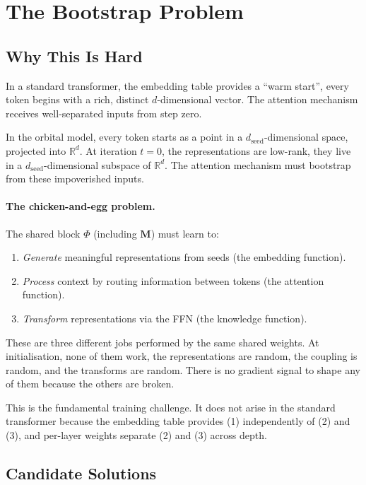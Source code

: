\documentclass[11pt, a4paper]{article}
\newcommand{\M}{\mathbf{M}}
\newcommand{\R}{\mathbb{R}}
\theoremstyle{remark}
\begin{document}
\section{The Bootstrap Problem}

\subsection{Why This Is Hard}

In a standard transformer, the embedding table provides a ``warm start'', every token begins with a rich, distinct $d$-dimensional vector.
The attention mechanism receives well-separated inputs from step zero.

In the orbital model, every token starts as a point in a $d_{\text{seed}}$-dimensional space, projected into $\R^d$.
At iteration $t{=}0$, the representations are low-rank, they live in a $d_{\text{seed}}$-dimensional subspace of $\R^d$.
The attention mechanism must bootstrap from these impoverished inputs.

\paragraph{The chicken-and-egg problem.}
The shared block $\Phi$ (including $\M$) must learn to:
\begin{enumerate}[nosep]
    \item \emph{Generate} meaningful representations from seeds (the embedding function).
    \item \emph{Process} context by routing information between tokens (the attention function).
    \item \emph{Transform} representations via the FFN (the knowledge function).
\end{enumerate}
These are three different jobs performed by the same shared weights.
At initialisation, none of them work, the representations are random, the coupling is random, and the transforms are random.
There is no gradient signal to shape any of them because the others are broken.

This is the fundamental training challenge.
It does not arise in the standard transformer because the embedding table provides (1) independently of (2) and (3), and per-layer weights separate (2) and (3) across depth.

\subsection{Candidate Solutions}
\end{document}
